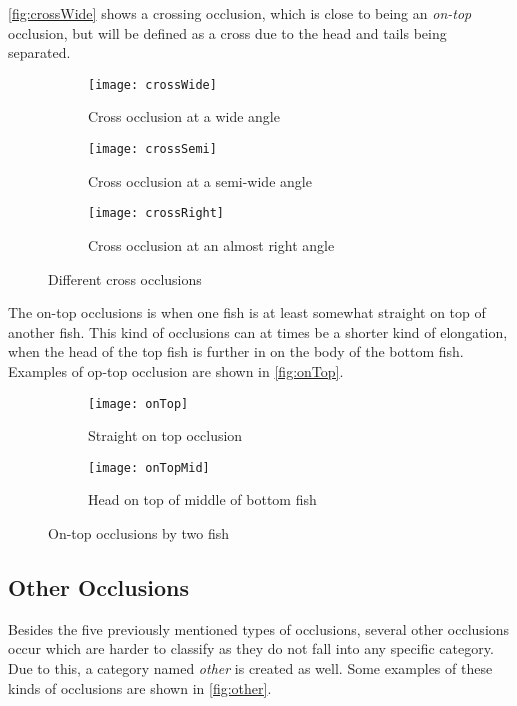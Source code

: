 \autoref{fig:crossWide} shows a crossing occlusion, which is close to being an \textit{on-top} occlusion, but will be defined as a cross due to the head and tails being separated.

\begin{figure}[H]
	\centering
	\begin{subfigure}[b]{0.3\textwidth}
		\texttt{[image: crossWide]}
		\caption{Cross occlusion at a wide angle}
		\label{fig:crossWide}
	\end{subfigure}
	\begin{subfigure}[b]{0.3\textwidth}
		\texttt{[image: crossSemi]}
		\caption{Cross occlusion at a semi-wide angle}
		\label{fig:crossSemi}
	\end{subfigure}
	\begin{subfigure}[b]{0.3\textwidth}
		\texttt{[image: crossRight]}
		\caption{Cross occlusion at an almost right angle}
		\label{fig:crossRight}
	\end{subfigure}
	\caption{Different cross occlusions}
	\label{fig:cross}
\end{figure}

The on-top occlusions is when one fish is at least somewhat straight on top of another fish. This kind of occlusions can at times be a shorter kind of elongation, when the head of the top fish is further in on the body of the bottom fish. Examples of op-top occlusion are shown in \autoref{fig:onTop}.

\begin{figure}[H]
	\centering
	\begin{subfigure}[b]{0.47\textwidth}
		\texttt{[image: onTop]}
		\caption{Straight on top occlusion}
		\label{fig:onTopFull}
	\end{subfigure}
	\begin{subfigure}[b]{0.47\textwidth}
		\texttt{[image: onTopMid]}
		\caption{Head on top of middle of bottom fish}
		\label{fig:onTopMid}
	\end{subfigure}
	\caption{On-top occlusions by two fish}
	\label{fig:onTop}
\end{figure}

\subsection{Other Occlusions}
Besides the five previously mentioned types of occlusions, several other occlusions occur which are harder to classify as they do not fall into any specific category. Due to this, a category named \textit{other} is created as well. Some examples of these kinds of occlusions are shown in \autoref{fig:other}.

